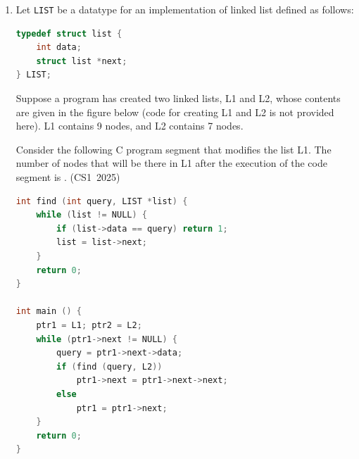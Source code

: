 \begin{enumerate}[label=\thesubsection.\arabic*, ref=\thesubsection.\theenumi]
At $\text{size} = 1$, the base case returns $\text{foo}(A+8, 1) = 1$:
\begin{align}
\text{foo}(A, 9) &= 1 + 1 + 1 + 1 + 1 \\
                 &= 5
\end{align}

Therefore, the value printed by the program is $5$.

\vspace{0.2cm}
The following code generates a random A[] and then performs the given function on it:
\begin{lstlisting}[frame=single, basicstyle=\rmfamily, escapeinside={(*@}{@*)}]
(*@\makebox[\dimexpr\linewidth-2\fboxsep-2\fboxrule\relax][c]{codes/foo.c}@*)
\end{lstlisting}

\vspace{0.5cm}
\item Let \texttt{LIST} be a datatype for an implementation of linked list defined as follows:
\begin{lstlisting}[language=C]
typedef struct list {
    int data;
    struct list *next;
} LIST;
\end{lstlisting}
Suppose a program has created two linked lists, L1 and L2, whose contents are given in the figure below (code for creating L1 and L2 is not provided here). L1 contains 9 nodes, and L2 contains 7 nodes.

\begin{figure}[H]
    \centering
    
\end{figure}

\vspace{0.5cm}
Consider the following C program segment that modifies the list L1. The number of nodes that will be there in L1 after the execution of the code segment is \underline{\hspace{1cm}}.
\hfill (CS1~2025)
\begin{lstlisting}[language=C]
int find (int query, LIST *list) {
    while (list != NULL) {
        if (list->data == query) return 1;
        list = list->next;
    }
    return 0;
}

int main () {
    ptr1 = L1; ptr2 = L2;
    while (ptr1->next != NULL) {
        query = ptr1->next->data;
        if (find (query, L2))
            ptr1->next = ptr1->next->next;
        else
            ptr1 = ptr1->next;
    }
    return 0;
}
\end{lstlisting}


\end{enumerate}

